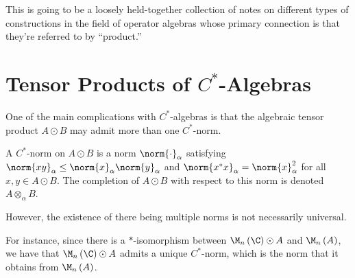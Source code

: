 \documentclass[10pt]{mypackage}
\begin{document}
\RaggedRight
This is going to be a loosely held-together collection of notes on different types of constructions in the field of operator algebras whose primary connection is that they're referred to by ``product.''
\section{Tensor Products of $C^{\ast}$-Algebras}%
One of the main complications with $C^{\ast}$-algebras is that the algebraic tensor product $A\odot B$ may admit more than one $C^{\ast}$-norm. 
\begin{definition}
  A $C^{\ast}$-norm on $A\odot B$ is a norm $\norm{\cdot}_{\alpha}$ satisfying $\norm{xy}_{\alpha}\leq \norm{x}_{\alpha}\norm{y}_{\alpha}$ and $\norm{x^{\ast}x}_{\alpha} = \norm{x}_{\alpha}^2$ for all $x,y\in A\odot B$. The completion of $A\odot B$ with respect to this norm is denoted $A\otimes_{\alpha}B$.
\end{definition}
However, the existence of there being multiple norms is not necessarily universal.

For instance, since there is a $\ast$-isomorphism between $\M_n\left( \C \right)\odot A$ and $\M_n\left( A \right)$, we have that $\M_n\left( \C \right)\odot A$ admits a unique $C^{\ast}$-norm, which is the norm that it obtains from $\M_n\left( A \right)$.
\end{document}
